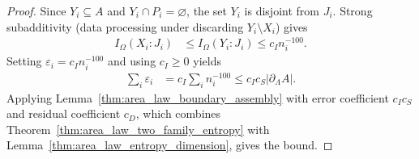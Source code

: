 \begin{proof}\leanok
    Since $Y_i\subseteq A$ and $Y_i\cap P_i=\varnothing$, the set $Y_i$ is
    disjoint from $J_i$. Strong subadditivity (data processing under
    discarding $Y_i\setminus X_i$) gives
    \begin{align*}
        I_\Omega(X_i:J_i) & \le I_\Omega(Y_i:J_i)
        \le c_I n_i^{-100}.
    \end{align*}
    Setting $\varepsilon_i=c_I n_i^{-100}$ and using $c_I\ge0$ yields
    \begin{align*}
        \sum_i\varepsilon_i
         & =c_I\sum_i n_i^{-100}
        \le c_Ic_S|\partial_\Lambda A|.
    \end{align*}
    Applying Lemma~\ref{thm:area_law_boundary_assembly} with error
    coefficient $c_Ic_S$ and residual coefficient $c_D$, which combines
    Theorem~\ref{thm:area_law_two_family_entropy} with
    Lemma~\ref{thm:area_law_entropy_dimension}, gives the bound.
\end{proof}

